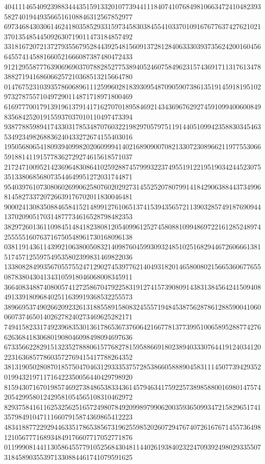 \begin{DoxyCode}
      404111465409239883444351591332010773944111840741076849810663472410482393582740194493566516108846312567852977
      697346843030614624180358529331597345830384554103370109167677637427621021370135485445092630719011473184857492
      331816720721372793556795284439254815609137281284063330393735624200160456645574145881660521666087387480472433
      912129558777639069690370788285277538940524607584962315743691711317613478388271941686066257210368513215664780
      014767523103935786068961112599602818393095487090590738613519145918195102973278755710497290114871718971800469
      616977700179139196137914171627070189584692143436967629274591099400600849835684252019155937037010110497473394
      938778859894174330317853487076032219829705797511914405109942358830345463534923498268836240433272674155403016
      195056806541809394099820206099941402168909007082133072308966211977553066591881411915778362729274615618571037
      217247100952142369648308641025928874579993223749551912219519034244523075351338068568073544649951272031744871
      954039761073080602699062580760202927314552520780799141842906388443734996814582733720726639176702011830046481
      900024130835088465841521489912761065137415394356572113903285749187690944137020905170314877734616528798482353
      382972601361109845148418238081205409961252745808810994869722161285248974255555160763716750548961730168096138
      038119143611439921063800508321409876045993093248510251682944672606661381517457125597549535802399831469822036
      133808284993567055755247129027453977621404931820146580080215665360677655087838043041343105918046068008345911
      366408348874080057412725867047922583191274157390809143831384564241509408491339180968402511639919368532255573
      389669537490266209232613188558915808324555719484538756287861288590041060060737465014026278240273469625282171
      749415823317492396835301361786536737606421667781377399510065895288774276626368418306801908046098498094697636
      673356622829151323527888061577682781595886691802389403330764419124034120223163685778603572769415417788264352
      381319050280870185750470463129333537572853866058889045831114507739429352019943219711716422350056440429798920
      815943071670198574692738486538334361457946341759225738985880016980147574205429958012429581054565108310462972
      829375841611625325625165724980784920998979906200359365099347215829651741357984910471116607915874369865412223
      483418877229294463351786538567319625598520260729476740726167671455736498121056777168934849176607717052771876
      011999081441130586455779105256843048114402619384023224709392498029335507318458903553971330884461741079591625

\end{DoxyCode}
